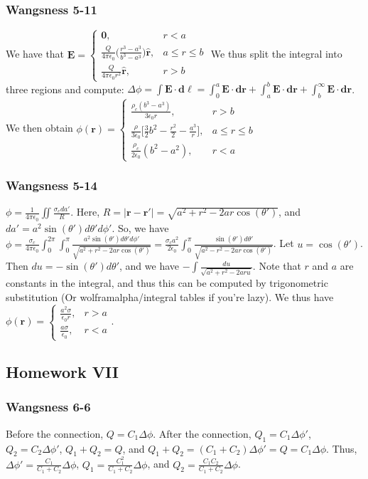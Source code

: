 \documentclass{article}
\theoremstyle{mystyle}
\begin{document}
\subsubsection{Wangsness 5-11}
We have that $\mathbf{E} = \begin{cases} \mathbf{0}, & r<a\\ \frac{Q}{4\pi \epsilon_0}\bigg(\frac{r^3-a^3}{b^3-a^3}\bigg)\hat{\mathbf{r}}, & a\leq r \leq b\\ \frac{Q}{4\pi \epsilon_0 r^2}\hat{\mathbf{r}}, & r>b\end{cases}$ We thus split the integral into three regions and compute: $\Delta\phi=\int \mathbf{E}\cdot \mathbf{d\ell} = \int_{0}^{a} \mathbf{E}\cdot \mathbf{dr}+\int_{a}^{b} \mathbf{E}\cdot \mathbf{dr}+\int_{b}^{\infty} \mathbf{E}\cdot \mathbf{dr}$. We then obtain $\phi(\mathbf{r}) = \begin{cases} \frac{\rho_c(b^3-a^3)}{3\epsilon_0 r}, & r>b \\ \frac{\rho}{3\epsilon_0}\bigg[ \frac{3}{2}b^2-\frac{r^2}{2}-\frac{a^3}{r}\bigg], & a\leq r \leq b\\ \frac{\rho_c}{2\epsilon_0}(b^2-a^2), & r<a\end{cases}$
\subsubsection{Wangsness 5-14}
$\phi = \frac{1}{4\pi \epsilon_0}\iint \frac{\sigma_c da'}{R}$. Here, $R = |\mathbf{r}-\mathbf{r}'| = \sqrt{a^2+r^2-2ar\cos(\theta')}$, and $da' = a^2\sin(\theta')d\theta'd\phi'$. So, we have $\phi = \frac{\sigma_c}{4\pi \epsilon_0}\int_{0}^{2\pi}\int_{0}^{\pi} \frac{a^2\sin(\theta')d\theta' d\phi'}{\sqrt{a^2+r^2-2ar\cos(\theta')}} = \frac{\sigma_c a^2}{2\epsilon_0}\int_{0}^{\pi} \frac{\sin(\theta')d\theta'}{\sqrt{a^2-r^2-2ar\cos(\theta')}}$. Let $u = \cos(\theta')$. Then $du = -\sin(\theta')d\theta'$, and we have $-\int\frac{du}{\sqrt{a^2+r^2-2aru}}$. Note that $r$ and $a$ are constants in the integral, and thus this can be computed by trigonometric substitution (Or wolframalpha/integral tables if you're lazy). We thus have $\phi(\mathbf{r}) = \begin{cases}\frac{a^2\sigma}{\epsilon_0 r}, & r>a \\ \frac{a\sigma}{\epsilon_0}, & r<a\end{cases}$.
\subsection{Homework VII}
\subsubsection{Wangsness 6-6}
Before the connection, $Q=C_1 \Delta \phi$. After the connection, $Q_1 = C_1 \Delta\phi'$, $Q_2 = C_2 \Delta \phi'$, $Q_1+Q_2=Q$, and $Q_1+Q_2=(C_1+C_2)\Delta \phi' = Q = C_1\Delta \phi$. Thus, $\Delta \phi' = \frac{C_1}{C_1+C_2}\Delta \phi$, $Q_1 = \frac{C_1^2}{C_1+C_2}\Delta \phi$, and $Q_2 = \frac{C_1 C_2}{C_1+C_2}\Delta \phi$.
\end{document}
